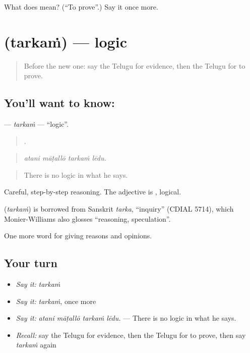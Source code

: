 \begin{tcolorbox}[breakable,colback=teal!4,colframe=teal!35!black,title={Before you move on}]
What does  mean? (\textquotedblleft{}To prove\textquotedblright{}.) Say it once more.
\end{tcolorbox}
\section[\texorpdfstring{\te{తర్కం} (tarkaṁ)}{తర్కం (tarkaṁ)}]{ (tarkaṁ) — logic}

\label{lesson:TE-C383-tarkam}



\begin{quote}
Before the new one: say the Telugu for evidence, then the Telugu for to prove.
\end{quote}

\subsection*{You'll want to know: }
\textbf{} — \emph{tarkaṁ} — \textquotedblleft{}logic\textquotedblright{}.

\begin{quote}
   .
\end{quote}

\begin{quote}
\emph{atani māṭallō tarkaṁ lēdu.}
\end{quote}

\begin{quote}
There is no logic in what he says.
\end{quote}

Careful, step-by-step reasoning. The adjective is , logical.

\begin{cousinweb}
\textbf{} (\emph{tarkaṁ}) is borrowed from Sanskrit \emph{tarka}, \textquotedblleft{}inquiry\textquotedblright{} (CDIAL 5714), which Monier-Williams also glosses \textquotedblleft{}reasoning, speculation\textquotedblright{}.
\end{cousinweb}

\begin{grammarlens}[title={What you've built}]
One more word for giving reasons and opinions.
\end{grammarlens}

\subsection*{Your turn}
\begin{itemize}
\raggedright
  \item \emph{Say it:} \emph{tarkaṁ}
  \item \emph{Say it:} \emph{tarkaṁ}, once more
  \item \emph{Say it:} \emph{atani māṭallō tarkaṁ lēdu.} — There is no logic in what he says.
  \item \emph{Recall:} say the Telugu for evidence, then the Telugu for to prove, then say \emph{tarkaṁ} again
\end{itemize}

